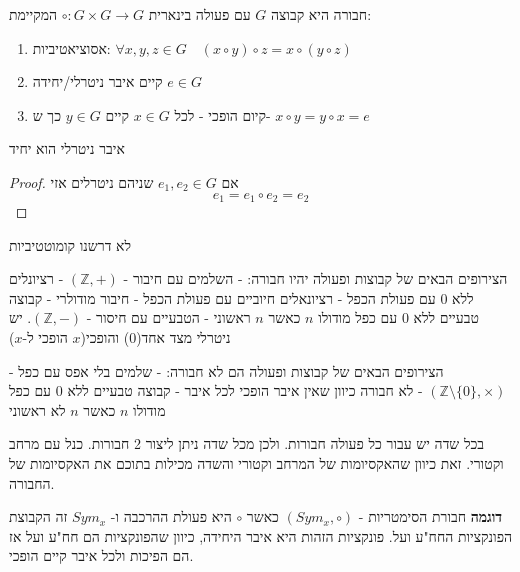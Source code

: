 \documentclass{tstextbook}
\begin{document}
\begin{definition}[חבורה]
חבורה היא קבוצה \(G\) עם פעולה בינארית \(\circ:G\times G\to G\)  המקיימת:

  \begin{enumerate}
    \item אסוציאטיביות: \(\forall x,y,z\in G\quad(x\circ y)\circ z=x\circ(y\circ z)\)


    \item קיים איבר ניטרלי/יחידה \(e\in G\)


    \item קיום הופכי - לכל \(x \in G\) קיים \(y\in G\) כך ש- \(x\circ y=y\circ x=e\)


  \end{enumerate}
\end{definition}
\begin{lemma}
איבר ניטרלי הוא יחיד

\end{lemma}
\begin{proof}
אם \(e_{1},e_{2}\in G\) שניהם ניטרלים אזי
$$e_{1}=e_{1}\circ e_{2}=e_{2}$$

\end{proof}
\begin{remark}
לא דרשנו קומוטטיביות

\end{remark}
\begin{example}
הצירופים הבאים של קבוצות ופעולה יהיו חבורה:
- השלמים עם חיבור - \((\mathbb{Z},+)\)
- רציונלים ללא 0 עם פעולת הכפל
- רציונאלים חיוביים עם פעולת הכפל
- חיבור מודולרי
- קבוצה טבעיים ללא 0 עם כפל מודולו \(n\) כאשר \(n\) ראשוני
- הטבעיים עם חיסור - \((\mathbb{Z},-)\). יש ניטרלי מצד אחד(0) והופכי(\(x\) הופכי ל-\(x\))

\end{example}
\begin{example}
הצירופים הבאים של קבוצות ופעולה הם לא חבורה:
- שלמים בלי אפס עם כפל - \((\mathbb{Z}\setminus \{ 0 \},\times)\) - לא חבורה כיוון שאין איבר הופכי לכל איבר
- קבוצה טבעיים ללא 0 עם כפל מודולו \(n\) כאשר \(n\) לא ראשוני

\end{example}
\begin{remark}
בכל שדה יש עבור כל פעולה חבורות. ולכן מכל שדה ניתן ליצור 2 חבורות. כנל עם מרחב וקטורי. זאת כיוון שהאקסיומות של המרחב וקטורי והשדה מכילות בתוכם את האקסיומות של החבורה.

\end{remark}
\textbf{דוגמה}
חבורת הסימטריות - \((Sym_{x},\circ)\) כאשר \(\circ\) היא פעולת ההרכבה ו- \(Sym_{x}\) זה הקבוצת הפונקציות החח"ע ועל. פונקציות הזהות היא איבר היחידה, כיוון שהפונקציות הם חח"ע ועל אז הם הפיכות ולכל איבר קיים הופכי.
\end{document}
